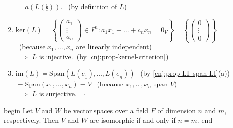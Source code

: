 \documentclass[
  12pt,
  a4paper,
  twoside]{article}
\theoremstyle{plain}
\theoremstyle{definition}
\begin{document}
\begin{enumerate}
  \hspace*{0.333em}\hspace*{0.333em}\hspace*{0.333em}\hspace*{0.333em}\hspace*{0.333em}\hspace*{0.333em}\hspace*{0.333em}\hspace*{0.333em}\hspace*{0.333em}\hspace*{0.333em}\hspace*{0.333em}\hspace*{0.333em} \(= a(L(\underline{b}))\). \hfill~{(by definition of \(L\))}
\item
  \(\mathrm{ker}(L) = \left\{ \begin{pmatrix} a_{1} \\ \vdots \\ a_{n} \end{pmatrix} \in F^{n} : a_{1}x_{1} + \dots + a_{n}x_{n} = 0_{V} \right\} = \left\{ \begin{pmatrix} 0 \\ \vdots \\ 0 \end{pmatrix} \right\}\)\\
  \hspace*{0.333em}\hfill~{(because \(x_{1}, \dots, x_{n}\) are linearly independent)}\\
  \(\implies\) \(L\) is injective.\hfill~{(by \ref{cnj:prop-kernel-criterion})}
\item
  \(\mathrm{im}(L) = \mathrm{Span}(L(\underline{e}_{1}), \dots, L(\underline{e}_{n}))\) \hfill~{(by \ref{cnj:prop-LT-span-LI}(a))}\\
  \hspace*{0.333em}\hspace*{0.333em}\hspace*{0.333em}\hspace*{0.333em}\hspace*{0.333em}\hspace*{0.333em} \(= \mathrm{Span}(x_{1}, \dots, x_{n}) = V\) \hfill~{(because \(x_{1}, \dots, x_{n}\) span \(V\))}\\
  \(\implies\) \(L\) is surjective. \hfill~{\(\square\)}
\end{enumerate}

\csname begin\label{cnj:thm-isodim}
Let \(V\) and \(W\) be vector spaces over a field \(F\) of dimension \(n\) and \(m\), respectively. Then \(V\) and \(W\) are isomorphic if and only if \(n=m\).
\csname end
\end{document}
